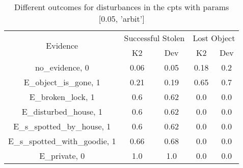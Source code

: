 \begin{table}\begin{tabular}{c|cc|cc}\toprule\multirow{2}{*}{Evidence} & \multicolumn{2}{c}{Successful Stolen} & \multicolumn{2}{c}{Lost Object} \\& {K2} & {Dev} & {K2} & {Dev} \\\midrule
no\_evidence, 0 & \cellcolor{Bittersweet}0.06&\cellcolor{Bittersweet}0.05&\cellcolor{Bittersweet}0.18&\cellcolor{Bittersweet}0.2\\E\_object\_is\_gone, 1 & \cellcolor{Bittersweet}0.21&\cellcolor{Bittersweet}0.19&\cellcolor{Bittersweet}0.65&\cellcolor{Bittersweet}0.7\\E\_broken\_lock, 1 & \cellcolor{Bittersweet}0.6&\cellcolor{Bittersweet}0.62&0.0&0.0\\E\_disturbed\_house, 1 & \cellcolor{Bittersweet}0.6&\cellcolor{Bittersweet}0.62&0.0&0.0\\E\_s\_spotted\_by\_house, 1 & \cellcolor{Bittersweet}0.6&\cellcolor{Bittersweet}0.62&0.0&0.0\\E\_s\_spotted\_with\_goodie, 1 & \cellcolor{Bittersweet}0.66&\cellcolor{Bittersweet}0.68&0.0&0.0\\E\_private, 0 & 1.0&1.0&0.0&0.0\\\bottomrule\end{tabular}\caption{Different outcomes for disturbances in the cpts with params [0.05, 'arbit']}\end{table}